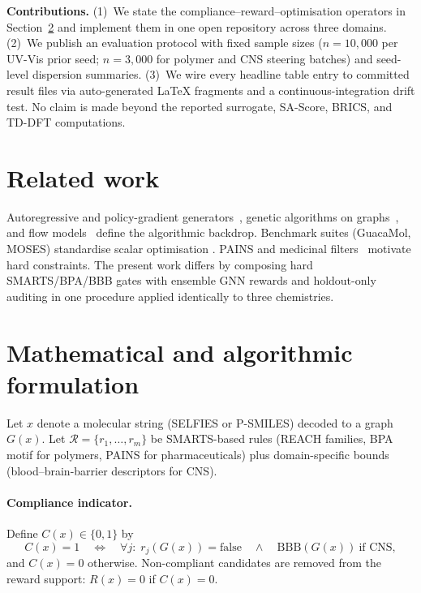 \documentclass[12pt]{article}
\begin{document}
\textbf{Contributions.} (1)~We state the compliance--reward--optimisation operators in
Section~\ref{sec:formulation} and implement them in one open repository across three domains.
(2)~We publish an evaluation protocol with fixed sample sizes ($n=10{,}000$ per UV-Vis prior seed;
$n=3{,}000$ for polymer and CNS steering batches) and seed-level dispersion summaries.
(3)~We wire every headline table entry to committed result files via auto-generated \LaTeX{} fragments
and a continuous-integration drift test. No claim is made beyond the reported surrogate, SA-Score,
BRICS, and TD-DFT computations.

\section{Related work}

Autoregressive and policy-gradient generators~\cite{segler2018generative,gomez2018automatic,blaschke2024reinvent4},
genetic algorithms on graphs~\cite{nigam2019augment,jin2020graphconv}, and flow models~\cite{zang2020mo}
define the algorithmic backdrop. Benchmark suites (GuacaMol, MOSES) standardise scalar optimisation
\cite{brown2019guacamol,Polykovskiy2020}. PAINS and medicinal filters~\cite{baell2010pains,brenk2008}
motivate hard constraints. The present work differs by composing hard SMARTS/BPA/BBB gates with
ensemble GNN rewards and holdout-only auditing in one procedure applied identically to three chemistries.

\section{Mathematical and algorithmic formulation}
\label{sec:formulation}

Let $x$ denote a molecular string (SELFIES or P-SMILES) decoded to a graph $G(x)$. Let
$\mathcal{R}=\{r_1,\ldots,r_m\}$ be SMARTS-based rules (REACH families, BPA motif for polymers,
PAINS for pharmaceuticals) plus domain-specific bounds (blood--brain-barrier descriptors for CNS).

\paragraph{Compliance indicator.}
Define $C(x)\in\{0,1\}$ by
\begin{equation}
C(x)=1 \quad\Leftrightarrow\quad \forall j:\; r_j(G(x))=\text{false}
\quad\land\quad \text{BBB}(G(x))\ \text{if CNS},
\end{equation}
and $C(x)=0$ otherwise. Non-compliant candidates are removed from the reward support:
$R(x)=0$ if $C(x)=0$.
\end{document}
